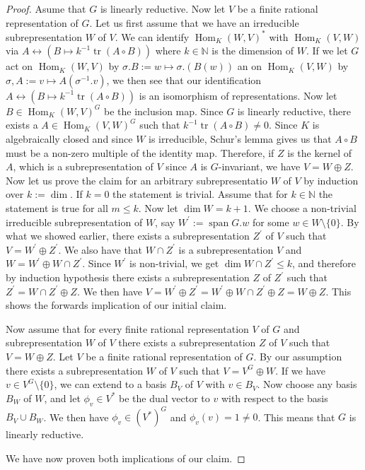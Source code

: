 \begin{proof}
  Asume that $G$ is linearly reductive.
  Now let $V$ be a finite rational representation of $G$.
  Let us first assume that we have an irreducible subrepresentation $W$ of $V$.
  We can identify $\operatorname{Hom}_K(W,V)^\ast$ with $\operatorname{Hom}_K(V,W)$ via  $A \leftrightarrow (B \mapsto k^{-1}\operatorname{tr}(A \circ B))$ where $k \in \mathbb{N}$ is the dimension of $W$.
  If we let $G$ act on $ \operatorname{Hom}_K(W,V)$ by $ \sigma.B :=  w \mapsto \sigma . (B(w))$ an on $\operatorname{Hom}_K(V,W)$ by $ \sigma,A := v \mapsto A(\sigma^{-1}.v) $, we then see that our identification $A \leftrightarrow (B \mapsto k^{-1}\operatorname{tr}(A \circ B))$ is an isomorphism of representations. %
  Now let $B \in \operatorname{Hom}_K(W,V)^G$ be the inclusion map.
  Since $G$ is linearly reductive, there exists a $A \in \operatorname{Hom}_K(V,W)^G$ such that $k^{-1} \operatorname{tr}(A \circ B) \neq 0$.
  Since $K$ is algebraically closed and since $W$ is irreducible, Schur's lemma gives us that $A \circ B$ must be a non-zero multiple of the identity map.
  Therefore, if $Z$ is the kernel of $A$, which is a subrepresentation of $V$ since $A$ is $G$-invariant, we have $V = W \oplus Z$.
  Now let us prove the claim for an arbitrary subrepresentatio $W$ of $V$ by induction over $k := \operatorname{dim}$.
  If $k=0$ the statement is trivial.
  Assume that for $k \in \mathbb{N}$ the statement is true for all $m \leq k$.
  Now let $\operatorname{dim}W = k +1$.
  We choose a non-trivial irreducible subrepresentation of $W$, say $W^\prime := \operatorname{span}G.w$ for some $w \in W \setminus \{0\}$.
  By what we showed earlier, there exists a subrepresentation $Z^\prime$ of $V$ such that $V = W^\prime \oplus Z^\prime$.
  We also have that $W \cap Z^\prime$ is a subrepresentation $V$ and $W = W^\prime \oplus W \cap Z^\prime$.
  Since $W^\prime$ is non-trivial, we get $\operatorname{dim} W \cap Z^\prime \leq k$, and therefore by induction hypothesis there exists a subrepresentation $Z$ of $Z^\prime$ such that $Z^\prime = W \cap Z^\prime \oplus Z$.
  We then have $V = W^\prime \oplus Z^\prime = W^\prime \oplus W \cap Z^\prime \oplus Z = W \oplus Z$.
  This shows the forwards implication of our initial claim.
  
  Now assume that for every finite rational representation $V$ of $G$ and subrepresentation $W$ of $V$ there exists a subrepresentation $Z$ of $V$ such that $V = W \oplus Z$.
  Let $V$ be a finite rational representation of $G$.
  By our assumption there exists a subrepresentation $W$ of $V$ such that $V = V^G \oplus W$.
  If we have $v \in V^G \setminus \{0\}$, we can extend to a basis $B_V$ of $V$ with $v \in B_V$.
  Now choose any basis $B_W$ of $W$, and let $\phi_v \in V^\ast$ be the dual vector to $v$ with respect to the basis $B_V \cup B_W$.
  We then have $\phi_v \in (V^\ast)^G $ and $\phi_v (v) = 1 \neq 0$.
  This means that $G$ is linearly reductive.

  We have now proven both implications of our claim.
\end{proof}

